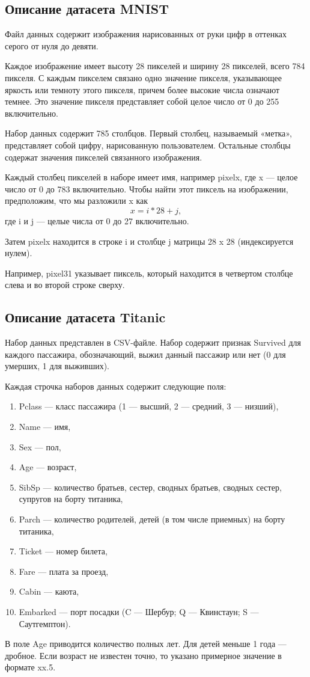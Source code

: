 \documentclass[a4paper]{article}
\begin{document}
\subsection{Описание датасета MNIST}
\normalsize{
    Файл данных содержит изображения нарисованных от руки цифр в оттенках серого от нуля до девяти.
    
    Каждое изображение имеет высоту 28 пикселей и ширину 28 пикселей, всего 784 пикселя. С каждым пикселем связано одно значение пикселя, указывающее яркость или темноту этого пикселя, причем более высокие числа означают темнее. Это значение пикселя представляет собой целое число от 0 до 255 включительно.
    
    Набор данных содержит 785 столбцов. Первый столбец, называемый «метка», представляет собой цифру, нарисованную пользователем. Остальные столбцы содержат значения пикселей связанного изображения.
    
    Каждый столбец пикселей в наборе имеет имя, например pixelx, где x — целое число от 0 до 783 включительно. Чтобы найти этот пиксель на изображении, предположим, что мы разложили x как
    \[x = i * 28 + j,\]
    где i и j — целые числа от 0 до 27 включительно.
    
    Затем pixelx находится в строке i и столбце j матрицы 28 x 28 (индексируется нулем).
    
    Например, pixel31 указывает пиксель, который находится в четвертом столбце слева и во второй строке сверху.
}

\subsection{Описание датасета Titanic}
\normalsize{
    Набор данных представлен в CSV-файле. Набор содержит признак Survived для каждого пассажира, обозначающий, выжил данный пассажир или нет (0 для умерших, 1 для выживших).
    
    Каждая строчка наборов данных содержит следующие поля:
    \begin{enumerate}
        \item Pclass — класс пассажира (1 — высший, 2 — средний, 3 — низший), 
        \item Name — имя, 
        \item Sex — пол, 
        \item Age — возраст, 
        \item SibSp — количество братьев, сестер, сводных братьев, сводных сестер, супругов на борту титаника,
        \item Parch — количество родителей, детей (в том числе приемных) на борту титаника,
        \item Ticket — номер билета,
        \item Fare — плата за проезд,
        \item Cabin — каюта,
        \item Embarked — порт посадки (C — Шербур; Q — Квинстаун; S — Саутгемптон).
    \end{enumerate}
     
    В поле Age приводится количество полных лет. Для детей меньше 1 года — дробное. Если возраст не известен точно, то указано примерное значение в формате xx.5.
}
\end{document}
